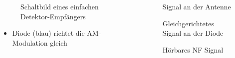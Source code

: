 \begin{frame}
\begin{columns}
    \begin{column}{0.48\textwidth}
    
\begin{figure}
    \caption{\scriptsize Schaltbild eines einfachen Detektor-Empfängers}
    \label{am_detektor}
\end{figure}

\begin{itemize}
  \item Diode (blau) richtet die AM-Modulation gleich
  \end{itemize}

    \end{column}
   \begin{column}{0.48\textwidth}
       
\begin{figure}
    \caption{\scriptsize Signal an der Antenne}
    \label{am_detektor_antenne}
\end{figure}


\begin{figure}
    \caption{\scriptsize Gleichgerichtetes Signal an der Diode}
    \label{am_detektor_diode}
\end{figure}


\begin{figure}
    \caption{\scriptsize Hörbares NF Signal}
    \label{am_detektor_kopfhoerer}
\end{figure}


   \end{column}
\end{columns}

\end{frame}

